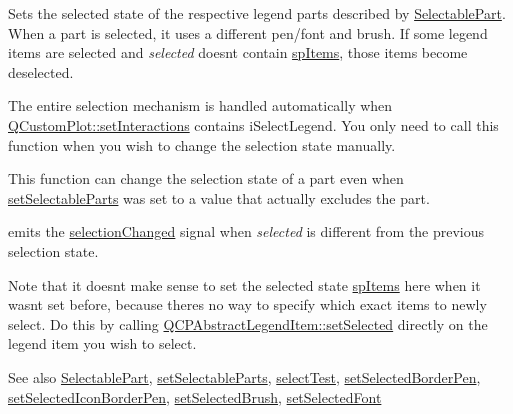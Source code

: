 Sets the selected state of the respective legend parts described by \mbox{\hyperlink{class_q_c_p_legend_a5404de8bc1e4a994ca4ae69e2c7072f1}{Selectable\+Part}}. When a part is selected, it uses a different pen/font and brush. If some legend items are selected and {\itshape selected} doesn\textquotesingle{}t contain \mbox{\hyperlink{class_q_c_p_legend_a5404de8bc1e4a994ca4ae69e2c7072f1a768bfb95f323db4c66473375032c0af7}{sp\+Items}}, those items become deselected.

The entire selection mechanism is handled automatically when \mbox{\hyperlink{class_q_custom_plot_a5ee1e2f6ae27419deca53e75907c27e5}{Q\+Custom\+Plot\+::set\+Interactions}} contains i\+Select\+Legend. You only need to call this function when you wish to change the selection state manually.

This function can change the selection state of a part even when \mbox{\hyperlink{class_q_c_p_legend_a9ce60aa8bbd89f62ae4fa83ac6c60110}{set\+Selectable\+Parts}} was set to a value that actually excludes the part.

emits the \mbox{\hyperlink{class_q_c_p_legend_a82c88464edac07a9eefaf3906268df3b}{selection\+Changed}} signal when {\itshape selected} is different from the previous selection state.

Note that it doesn\textquotesingle{}t make sense to set the selected state \mbox{\hyperlink{class_q_c_p_legend_a5404de8bc1e4a994ca4ae69e2c7072f1a768bfb95f323db4c66473375032c0af7}{sp\+Items}} here when it wasn\textquotesingle{}t set before, because there\textquotesingle{}s no way to specify which exact items to newly select. Do this by calling \mbox{\hyperlink{class_q_c_p_abstract_legend_item_a6eed93b0ab99cb3eabb043fb08179c2b}{Q\+C\+P\+Abstract\+Legend\+Item\+::set\+Selected}} directly on the legend item you wish to select.

\begin{DoxySeeAlso}{See also}
\mbox{\hyperlink{class_q_c_p_legend_a5404de8bc1e4a994ca4ae69e2c7072f1}{Selectable\+Part}}, \mbox{\hyperlink{class_q_c_p_legend_a9ce60aa8bbd89f62ae4fa83ac6c60110}{set\+Selectable\+Parts}}, \mbox{\hyperlink{class_q_c_p_legend_acd7be544c81324e391cfa6be9c413c01}{select\+Test}}, \mbox{\hyperlink{class_q_c_p_legend_a2c35d262953a25d96b6112653fbefc88}{set\+Selected\+Border\+Pen}}, \mbox{\hyperlink{class_q_c_p_legend_ade93aabe9bcccaf9cf46cec22c658027}{set\+Selected\+Icon\+Border\+Pen}}, \mbox{\hyperlink{class_q_c_p_legend_a875227f3219c9799464631dec5e8f1bd}{set\+Selected\+Brush}}, \mbox{\hyperlink{class_q_c_p_legend_ab580a01c3c0a239374ed66c29edf5ad2}{set\+Selected\+Font}} 
\end{DoxySeeAlso}
\mbox{\label{class_q_c_p_legend_a7674dfc7a1f30e1abd1018c0ed45e0bc}} 
